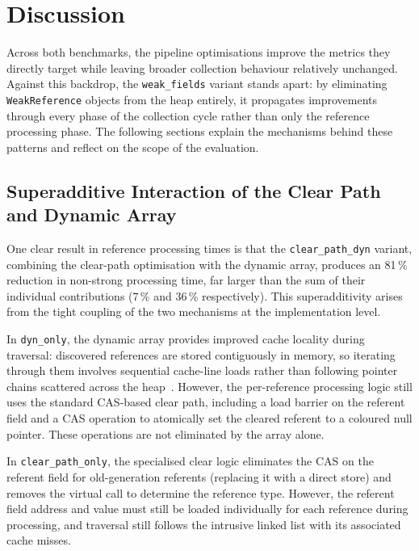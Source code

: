 \chapter{Discussion}
\label{chap:discussion}

Across both benchmarks, the pipeline optimisations improve the metrics they directly target while leaving broader collection behaviour relatively unchanged. Against this backdrop, the \texttt{weak\_fields} variant stands apart: by eliminating \texttt{WeakReference} objects from the heap entirely, it propagates improvements through every phase of the collection cycle rather than only the reference processing phase. The following sections explain the mechanisms behind these patterns and reflect on the scope of the evaluation.

\section{Superadditive Interaction of the Clear Path and Dynamic Array}
\label{sec:disc-synergy}

One clear result in reference processing times is that the \texttt{clear\_path\_dyn} variant, combining the clear-path optimisation with the dynamic array, produces an 81\,\% reduction in non-strong processing time, far larger than the sum of their individual contributions (7\,\% and 36\,\% respectively). This superadditivity arises from the tight coupling of the two mechanisms at the implementation level.

In \texttt{dyn\_only}, the dynamic array provides improved cache locality during traversal: discovered references are stored contiguously in memory, so iterating through them involves sequential cache-line loads rather than following pointer chains scattered across the heap~\cite{drepper07-memory}. However, the per-reference processing logic still uses the standard \ac{CAS}-based clear path, including a load barrier on the referent field and a \ac{CAS} operation to atomically set the cleared referent to a coloured null pointer. These operations are not eliminated by the array alone.

In \texttt{clear\_path\_only}, the specialised clear logic eliminates the \ac{CAS} on the referent field for old-generation referents (replacing it with a direct store) and removes the virtual call to determine the reference type. However, the referent field address and value must still be loaded individually for each reference during processing, and traversal still follows the intrusive linked list with its associated cache misses.

